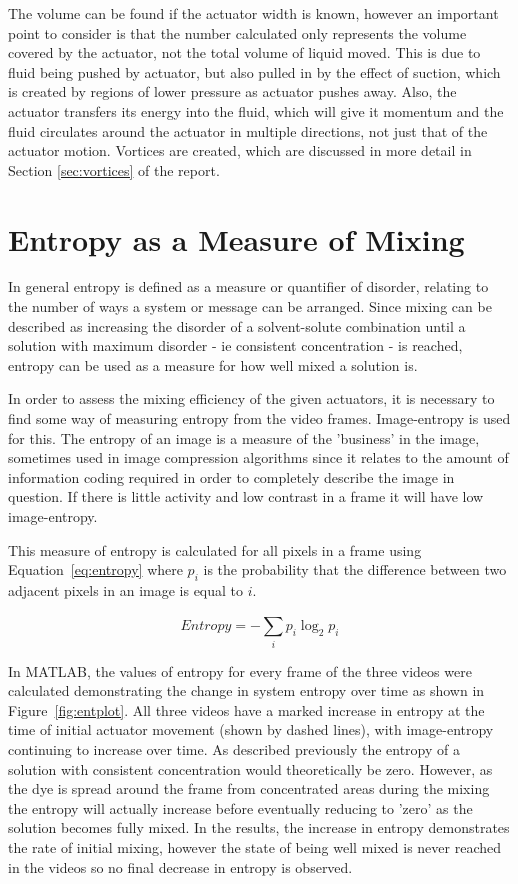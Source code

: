 The volume can be found if the actuator width is known, however an important point to consider is that the number calculated only represents the volume covered by the actuator, not the total volume of liquid moved. This is due to fluid being pushed by actuator, but also pulled in by the effect of suction, which is created by regions of lower pressure as actuator pushes away. Also, the actuator transfers its energy into the fluid, which will give it momentum and the fluid circulates around the actuator in multiple directions, not just that of the actuator motion. Vortices are created, which are discussed in more detail in Section \ref{sec:vortices} of the report.




\section{Entropy as a Measure of Mixing}
\label{sec:entropy}
In general entropy is defined as a measure or quantifier of disorder, relating to the number of ways a system or message can be arranged. Since mixing can be described as increasing the disorder of a solvent-solute combination until a solution with maximum disorder - ie consistent concentration - is reached, entropy can be used as a measure for how well mixed a solution is.

In order to assess the mixing efficiency of the given actuators, it is necessary to find some way of measuring entropy from the video frames. Image-entropy is used for this. The entropy of an image is a measure of the 'business' in the image, sometimes used in image compression algorithms since it relates to the amount of information coding required in order to completely describe the image in question. If there is little activity and low contrast in a frame it will have low image-entropy. 

This measure of entropy is calculated for all pixels in a frame using Equation~\ref{eq:entropy} where $p_i$ is the probability that the difference between two adjacent pixels in an image is equal to $i$.

\begin{equation}\label{eq:entropy}
Entropy = -\sum\limits_{i}^{}p_{i}\log_2 p_{i}
\end{equation}

In MATLAB, the values of entropy for every frame of the three videos were calculated demonstrating the change in system entropy over time as shown in Figure~\ref{fig:entplot}. All three videos have a marked increase in entropy at the time of initial actuator movement (shown by dashed lines), with image-entropy continuing to increase over time. As described previously the entropy of a solution with consistent concentration would theoretically be zero. However, as the dye is spread around the frame from concentrated areas during the mixing the entropy will actually increase before eventually reducing to 'zero' as the solution becomes fully mixed. In the results, the increase in entropy demonstrates the rate of initial mixing, however the state of being well mixed is never reached in the videos so no final decrease in entropy is observed.


